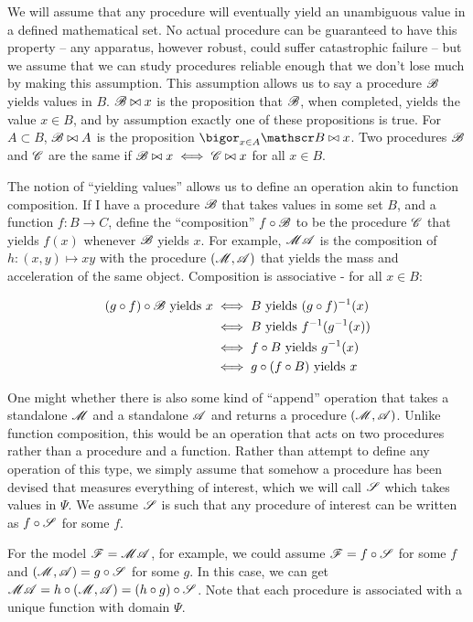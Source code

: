 We will assume that any procedure will eventually yield an unambiguous value in a defined mathematical set. No actual procedure can be guaranteed to have this property -- any apparatus, however robust, could suffer catastrophic failure -- but we assume that we can study procedures reliable enough that we don't lose much by making this assumption. This assumption allows us to say a procedure $\mathscr{B}$ yields values in $B$. $\mathscr{B}\bowtie x$ is the proposition that $\mathscr{B}$, when completed, yields the value $x\in B$, and by assumption exactly one of these propositions is true. For $A\subset B$, $\mathscr{B}\bowtie A$ is the proposition $\bigor_{x\in A} \proc{B}\bowtie x$. Two procedures $\mathscr{B}$ and $\mathscr{C}$ are the same if $\mathscr{B}\bowtie x\iff \mathscr{C}\bowtie x$ for all $x\in B$. 

The notion of ``yielding values'' allows us to define an operation akin to function composition. If I have a procedure $\mathscr{B}$ that takes values in some set $B$, and a function $f:B\to C$, define the ``composition'' $f\circ \mathscr{B}$ to be the procedure $\mathscr{C}$ that yields $f(x)$ whenever $\mathscr{B}$ yields $x$. For example, $\mathscr{MA}$ is the composition of $h:(x,y)\mapsto xy$ with the procedure $(\mathscr{M},\mathscr{A})$ that yields the mass and acceleration of the same object. Composition is associative - for all $x\in B$: 

\begin{align}
	(g\circ f)\circ\mathscr{B}\text{ yields } x &\iff B\text{ yields } (g\circ f)^{-1}(x) \\
	&\iff B\text{ yields } f^{-1}(g^{-1}(x))\\
	&\iff f\circ B \text{ yields } g^{-1}(x)\\
	&\iff g\circ(f\circ B)\text{ yields } x
\end{align}


One might whether there is also some kind of ``append'' operation that takes a standalone $\mathscr{M}$ and a standalone $\mathscr{A}$ and returns a procedure $(\mathscr{M},\mathscr{A})$. Unlike function composition, this would be an operation that acts on two procedures rather than a procedure and a function. Rather than attempt to define any operation of this type, we simply assume that somehow a procedure has been devised that measures everything of interest, which we will call $\mathscr{S}$ which takes values in $\Psi$. We assume $\mathscr{S}$ is such that any procedure of interest can be written as $f\circ \mathscr{S}$ for some $f$.

For the model $\mathscr{F}=\mathscr{MA}$, for example, we could assume $\mathscr{F}=f\circ \mathscr{S}$ for some $f$ and $(\mathscr{M},\mathscr{A})=g\circ \mathscr{S}$ for some $g$. In this case, we can get $\mathscr{MA}=h\circ(\mathscr{M},\mathscr{A})=(h\circ g)\circ\mathscr{S}$. Note that each procedure is associated with a unique function with domain $\Psi$.

